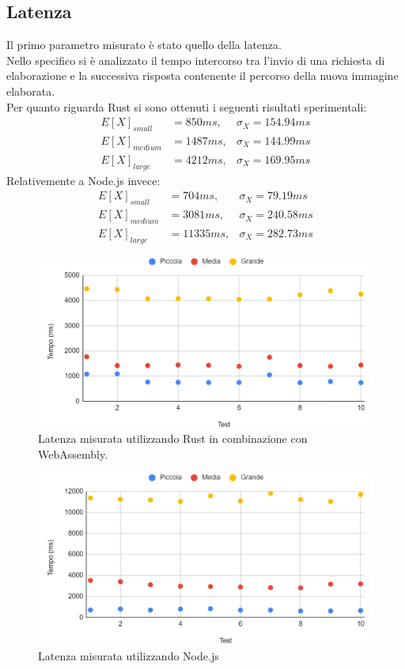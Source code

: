 \subsection{Latenza}
Il primo parametro misurato è stato quello della latenza.
\\Nello specifico si è analizzato il tempo intercorso tra l'invio di una richiesta di elaborazione e la successiva risposta contenente il percorso della nuova immagine elaborata.
\\Per quanto riguarda Rust si sono ottenuti i seguenti risultati sperimentali:
\begin{align*}
    E[X]_{small}&=850ms,  & \sigma_X=154.94ms\\
    E[X]_{medium}&=1487ms, & \sigma_X=144.99ms\\
    E[X]_{large}&=4212ms,  & \sigma_X=169.95ms
\end{align*}
Relativemente a Node.js invece:
\begin{align*}
    E[X]_{small}&=704ms,  & \sigma_X=79.19ms\\
    E[X]_{medium}&=3081ms, & \sigma_X=240.58ms\\
    E[X]_{large}&=11335ms,  & \sigma_X=282.73ms
\end{align*}
\begin{figure}
    \begin{center}
            \includegraphics[width=1\columnwidth]{images/rust_latenza.png}
    \end{center}
    \caption{Latenza misurata utilizzando Rust in combinazione con WebAssembly.}
\end{figure}
\begin{figure}
    \begin{center}
            \includegraphics[width=1\columnwidth]{images/node_latenza.png}
    \end{center}
    \caption{Latenza misurata utilizzando Node.js}
\end{figure}
